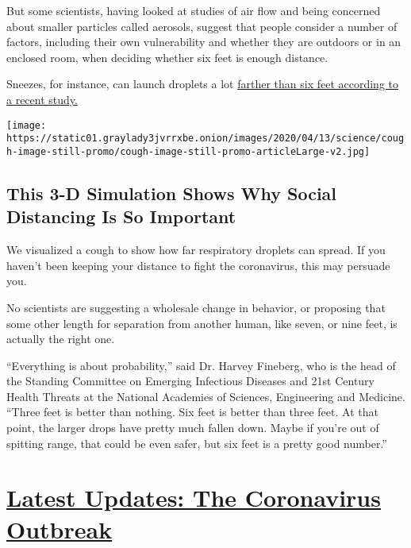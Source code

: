 But some scientists, having looked at studies of air flow and being
concerned about smaller particles called aerosols, suggest that people
consider a number of factors, including their own vulnerability and
whether they are outdoors or in an enclosed room, when deciding whether
six feet is enough distance.

Sneezes, for instance, can launch droplets a lot
\href{https://jamanetwork.com/journals/jama/fullarticle/2763852}{farther
than six feet according to a recent study.}

\href{https://www.nytimes3xbfgragh.onion/interactive/2020/04/14/science/coronavirus-transmission-cough-6-feet-ar-ul.html}{}

\texttt{[image: https://static01.graylady3jvrrxbe.onion/images/2020/04/13/science/cough-image-still-promo/cough-image-still-promo-articleLarge-v2.jpg]}

\hypertarget{this-3-d-simulation-shows-why-social-distancing-is-so-important}{%
\subsection{This 3-D Simulation Shows Why Social Distancing Is So
Important}\label{this-3-d-simulation-shows-why-social-distancing-is-so-important}}

We visualized a cough to show how far respiratory droplets can spread.
If you haven't been keeping your distance to fight the coronavirus, this
may persuade you.

No scientists are suggesting a wholesale change in behavior, or
proposing that some other length for separation from another human, like
seven, or nine feet, is actually the right one.

``Everything is about probability,'' said Dr. Harvey Fineberg, who is
the head of the Standing Committee on Emerging Infectious Diseases and
21st Century Health Threats at the National Academies of Sciences,
Engineering and Medicine. ``Three feet is better than nothing. Six feet
is better than three feet. At that point, the larger drops have pretty
much fallen down. Maybe if you're out of spitting range, that could be
even safer, but six feet is a pretty good number.''

\hypertarget{latest-updates-the-coronavirus-outbreak}{%
\section{\texorpdfstring{\href{https://www.nytimes3xbfgragh.onion/2020/08/17/world/coronavirus-covid.html?action=click\&pgtype=Article\&state=default\&region=MAIN_CONTENT_1\&context=storylines_live_updates}{Latest
Updates: The Coronavirus
Outbreak}}{Latest Updates: The Coronavirus Outbreak}}\label{latest-updates-the-coronavirus-outbreak}}

